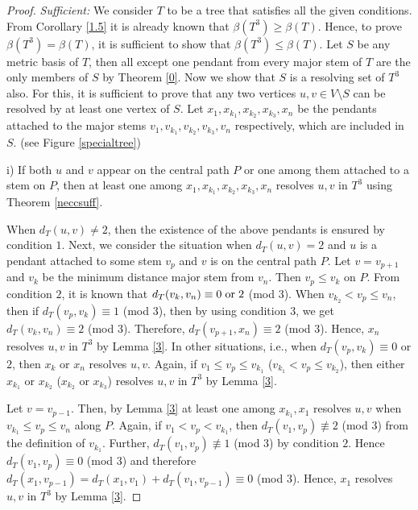 \documentclass{article}
\theoremstyle{definition}
\numberwithin{equation}{section}
\begin{document}
\begin{proof}
\vspace{0.4em}
\noindent \textit{Sufficient:}  We consider $T$ to be a tree that satisfies all the given conditions. From Corollary \ref{1.5} it is already known that $\beta{(T^{3})}\geq \beta{(T)}$. Hence, to prove $\beta{(T^{3})}=\beta{(T)}$, it is sufficient to show that $\beta{(T^{3})}\leq \beta{(T)}$. Let $S$ be any metric basis of $T$, then all except one pendant from every major stem of $T$ are the only members of $S$ by Theorem \ref{0}. Now we show that $S$ is a resolving set of $T^{3}$ also.
For this, it is sufficient to prove that any two vertices $u,v\in V\setminus S$ can be resolved by at least one vertex of $S$. Let $x_{1},x_{k_{1}},x_{k_{2}},x_{k_{3}},x_{n}$ be the pendants attached to the major stems $v_{1},v_{k_{1}},v_{k_{2}},v_{k_{3}}, v_{n}$ respectively, which are included in $S$. (see Figure \ref{specialtree})
\vspace{0.2em}

i) If both $u$ and $v$ appear on the central path $P$ or one among them attached to a stem on $P$, then at least one among $x_{1},x_{k_{1}}, x_{k_{2}}, x_{k_{3}},x_{n}$ resolves $u,v$ in $T^{3}$ using Theorem \ref{neccsuff}. 

\vspace{0.4em}

When $d_{T}(u,v)\neq 2$, then the existence of the above pendants is ensured by condition $1$. Next, we consider the situation when $d_{T}(u,v)=2$ and $u$ is a pendant attached to some stem $v_{p}$ and $v$ is on the central path $P$.
Let $v=v_{p+1}$ and $v_{k}$ be the minimum distance major stem from $v_{n}$. Then $v_{p}\leq v_{k}$ on $P$. From condition $2$, it is known that $d_{T}(v_{k},v_{n})\equiv 0 \hspace{0.3em} \mbox{or} \hspace{0.3em} 2$ (mod $3$). When $v_{k_{2}}<v_{p}\leq v_{n}$, then if $d_{T}(v_{p},v_{k})\equiv 1$ (mod $3$), then by using condition $3$, we get $d_{T}(v_{k},v_{n})\equiv 2$ (mod $3$). Therefore, $d_{T}(v_{p+1},x_{n})\equiv 2$ (mod $3$). Hence, $x_{n}$ resolves $u,v$ in $T^{3}$ by Lemma \ref{3}. In other situations, i.e., when $d_{T}(v_{p},v_{k})\equiv 0$ or $2$, then $x_{k}$ or $x_{n}$ resolves $u,v$.
Again, if $v_{1}\leq v_{p}\leq v_{k_{1}}$ ($v_{k_{1}}<v_{p}\leq v_{k_{2}}$), then either $x_{k_{1}}$ or $x_{k_{2}}$ ($x_{k_{2}}$ or $x_{k_{3}}$) resolves $u,v$ in $T^{3}$ by Lemma \ref{3}. 

\vspace{0.4em}
Let $v=v_{p-1}$. Then, by Lemma \ref{3} at least one among $x_{k_{1}},x_{1}$ resolves $u,v$ when $v_{k_{1}}\leq v_{p}\leq v_{n}$ along $P$. Again, if $v_{1}<v_{p}< v_{k_{1}}$, then $d_{T}(v_{1},v_{p})\not\equiv 2$ (mod $3$) from the definition of $v_{k_{1}}$. Further, $d_{T}(v_{1},v_{p})\not\equiv 1$ (mod $3$) by condition $2$.  Hence $d_{T}(v_{1},v_{p})\equiv 0$ (mod $3$) and therefore $d_{T}(x_{1},v_{p-1})=d_{T}(x_{1},v_{1})+d_{T}(v_{1},v_{p-1})\equiv 0$ (mod $3$). Hence, $x_{1}$ resolves $u,v$ in $T^{3}$ by Lemma \ref{3}. 
\vspace{0.4em}


\end{proof}
\end{document}
